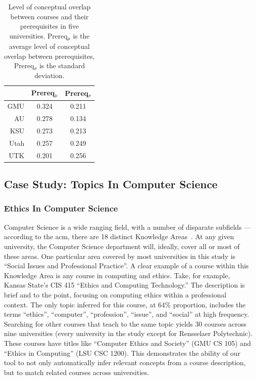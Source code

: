 
\begin{table}
  \centering
  \begin{tabular}{rcc}
    \toprule
     & Prereq$_\mu$ & Prereq$_\sigma$ \\
    \midrule
    GMU  & 0.324 & 0.211 \\
    AU   & 0.278 & 0.134 \\
    KSU  & 0.273 & 0.213 \\
    Utah & 0.257 & 0.249 \\
    UTK  & 0.201 & 0.256 \\
    \bottomrule
  \end{tabular}
  \caption{Level of conceptual overlap between courses and their prerequisites in five universities. Prereq$_\mu$ is the average level of conceptual overlap between prerequisites, Prereq$_\sigma$ is the standard deviation.\label{tbl:prereq-topic-overlap}}
\end{table}


\subsection{Case Study: Topics In Computer Science}
\label{sec:eval-topics}


\subsubsection{Ethics In Computer Science}
\label{sec:eval-topics-ethics}


Computer Science is a wide ranging field, with a number of disparate subfields --- according to the \ac{acm}, there are 18 distinct Knowledge Areas~\cite{CS2013}.
At any given university, the Computer Science department will, ideally, cover all or most of these areas.
One particular area covered by most universities in this study is ``Social Issues and Professional Practice''.
A clear example of a course within this Knowledge Area is any course in computing and ethics.
Take, for example, Kansas State's CIS 415 ``Ethics and Computing Technology.''
The description is brief and to the point, focusing on computing ethics within a professional context.
The only topic inferred for this course, at 64\% proportion, includes the terms ``ethics'', ``computer'', ``profession'', ``issue'', and ``social'' at high frequency.
Searching for other courses that teach to the same topic yields 30 courses across nine universities (every university in the study except for Rensselaer Polytechnic).
These courses have titles like ``Computer Ethics and Society'' (GMU CS 105) and ``Ethics in Computing'' (LSU CSC 1200).
This demonstrates the ability of our tool to not only automatically infer relevant concepts from a course description, but to match related courses across universities.


